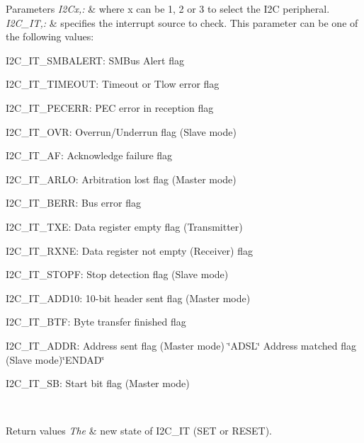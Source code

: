 \begin{DoxyParams}{Parameters}
{\em I2\-Cx,\-:} & where x can be 1, 2 or 3 to select the I2\-C peripheral. \\
\hline
{\em I2\-C\-\_\-\-I\-T,\-:} & specifies the interrupt source to check. This parameter can be one of the following values\-: \begin{DoxyItemize}
\item I2\-C\-\_\-\-I\-T\-\_\-\-S\-M\-B\-A\-L\-E\-R\-T\-: S\-M\-Bus Alert flag \item I2\-C\-\_\-\-I\-T\-\_\-\-T\-I\-M\-E\-O\-U\-T\-: Timeout or Tlow error flag \item I2\-C\-\_\-\-I\-T\-\_\-\-P\-E\-C\-E\-R\-R\-: P\-E\-C error in reception flag \item I2\-C\-\_\-\-I\-T\-\_\-\-O\-V\-R\-: Overrun/\-Underrun flag (Slave mode) \item I2\-C\-\_\-\-I\-T\-\_\-\-A\-F\-: Acknowledge failure flag \item I2\-C\-\_\-\-I\-T\-\_\-\-A\-R\-L\-O\-: Arbitration lost flag (Master mode) \item I2\-C\-\_\-\-I\-T\-\_\-\-B\-E\-R\-R\-: Bus error flag \item I2\-C\-\_\-\-I\-T\-\_\-\-T\-X\-E\-: Data register empty flag (Transmitter) \item I2\-C\-\_\-\-I\-T\-\_\-\-R\-X\-N\-E\-: Data register not empty (Receiver) flag \item I2\-C\-\_\-\-I\-T\-\_\-\-S\-T\-O\-P\-F\-: Stop detection flag (Slave mode) \item I2\-C\-\_\-\-I\-T\-\_\-\-A\-D\-D10\-: 10-\/bit header sent flag (Master mode) \item I2\-C\-\_\-\-I\-T\-\_\-\-B\-T\-F\-: Byte transfer finished flag \item I2\-C\-\_\-\-I\-T\-\_\-\-A\-D\-D\-R\-: Address sent flag (Master mode) \char`\"{}\-A\-D\-S\-L\char`\"{} Address matched flag (Slave mode)\char`\"{}\-E\-N\-D\-A\-D\char`\"{} \item I2\-C\-\_\-\-I\-T\-\_\-\-S\-B\-: Start bit flag (Master mode) \end{DoxyItemize}
\\
\hline
\end{DoxyParams}

\begin{DoxyRetVals}{Return values}
{\em The} & new state of I2\-C\-\_\-\-I\-T (S\-E\-T or R\-E\-S\-E\-T). \\
\hline
\end{DoxyRetVals}


